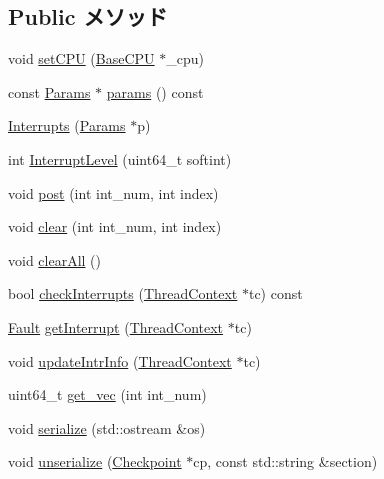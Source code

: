 \subsection*{Public メソッド}
\begin{DoxyCompactItemize}
\item 
void \hyperlink{classSparcISA_1_1Interrupts_a2ab8c6aed9969bc58d6aa2427d442cc4}{setCPU} (\hyperlink{classBaseCPU}{BaseCPU} $\ast$\_\-cpu)
\item 
const \hyperlink{classSparcISA_1_1Interrupts_a1480e28e439219daadcc82008890f5d7}{Params} $\ast$ \hyperlink{classSparcISA_1_1Interrupts_acd3c3feb78ae7a8f88fe0f110a718dff}{params} () const 
\item 
\hyperlink{classSparcISA_1_1Interrupts_a3d148759405b99148e0c34750966edb1}{Interrupts} (\hyperlink{classSparcISA_1_1Interrupts_a1480e28e439219daadcc82008890f5d7}{Params} $\ast$p)
\item 
int \hyperlink{classSparcISA_1_1Interrupts_af15feb308e3a6ec0180955608ab53125}{InterruptLevel} (uint64\_\-t softint)
\item 
void \hyperlink{classSparcISA_1_1Interrupts_a24c6c4fbdc0605bcd015ce06f194e4b4}{post} (int int\_\-num, int index)
\item 
void \hyperlink{classSparcISA_1_1Interrupts_af60c3484087379d0330467d77f6cbaae}{clear} (int int\_\-num, int index)
\item 
void \hyperlink{classSparcISA_1_1Interrupts_a798729dca95209ecdc609807a653a2bf}{clearAll} ()
\item 
bool \hyperlink{classSparcISA_1_1Interrupts_af3c66fb49fec598cf78aaec29d764952}{checkInterrupts} (\hyperlink{classThreadContext}{ThreadContext} $\ast$tc) const 
\item 
\hyperlink{classRefCountingPtr}{Fault} \hyperlink{classSparcISA_1_1Interrupts_ae603c88d759977611d3bcc6e2deb61ae}{getInterrupt} (\hyperlink{classThreadContext}{ThreadContext} $\ast$tc)
\item 
void \hyperlink{classSparcISA_1_1Interrupts_a00892e9b06edcba6c3c27454d6235100}{updateIntrInfo} (\hyperlink{classThreadContext}{ThreadContext} $\ast$tc)
\item 
uint64\_\-t \hyperlink{classSparcISA_1_1Interrupts_a87abae3604f8bd69ae89e91881110a39}{get\_\-vec} (int int\_\-num)
\item 
void \hyperlink{classSparcISA_1_1Interrupts_a53e036786d17361be4c7320d39c99b84}{serialize} (std::ostream \&os)
\item 
void \hyperlink{classSparcISA_1_1Interrupts_af22e5d6d660b97db37003ac61ac4ee49}{unserialize} (\hyperlink{classCheckpoint}{Checkpoint} $\ast$cp, const std::string \&section)
\end{DoxyCompactItemize}
